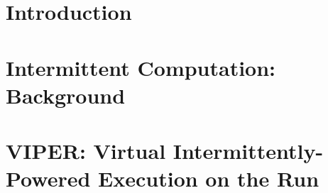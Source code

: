\documentclass[pageno]{jpaper}
\newcommand{\sysfull}{VIPER: Virtual Intermittently-Powered Execution on the Run}
\begin{document}



\section{Introduction}
\label{sec:intro}



\section{Intermittent Computation: Background}
\label{sec:background}



\section{\sysfull}
\label{sec:overeall_system}
\end{document}
